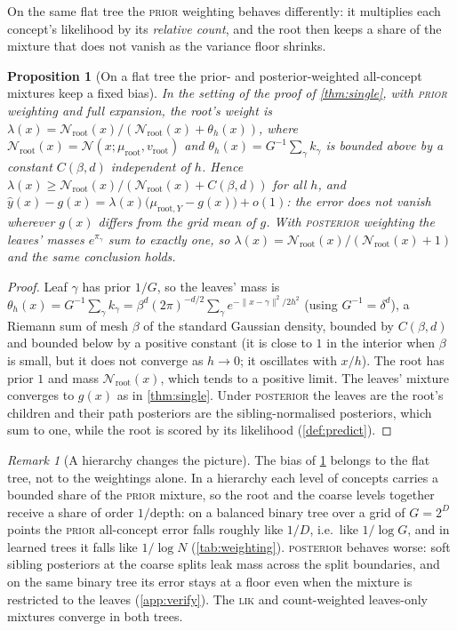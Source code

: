 \documentclass[11pt]{article}
\newtheorem{proposition}[theorem]{Proposition}
\theoremstyle{definition}
\theoremstyle{remark}
\newtheorem{remark}[theorem]{Remark}
\newcommand{\N}{\mathcal{N}}
\newcommand{\hy}{\hat{y}}
\begin{document}
On the same flat tree the \textsc{prior} weighting behaves differently: it multiplies each
concept's likelihood by its \emph{relative count}, and the root then keeps a share of the
mixture that does not vanish as the variance floor shrinks.

\begin{proposition}[On a flat tree the prior- and posterior-weighted all-concept mixtures keep a fixed bias]\label{prop:prior}
In the setting of the proof of \cref{thm:single}, with \textsc{prior} weighting and full
expansion, the root's weight is
$\lambda(x)=\N_{\text{root}}(x)/(\N_{\text{root}}(x)+\theta_h(x))$, where
$\N_{\text{root}}(x)=\N(x;\mu_{\text{root}},v_{\text{root}})$ and
$\theta_h(x)=G^{-1}\sum_\gamma k_\gamma$ is bounded above by a constant $C(\beta,d)$
independent of $h$.  Hence $\lambda(x)\ge\N_{\text{root}}(x)/(\N_{\text{root}}(x)+C(\beta,d))$
for all $h$, and $\hy(x)-g(x)=\lambda(x)\bigl(\mu_{\text{root},Y}-g(x)\bigr)+o(1)$: the
error does not vanish wherever $g(x)$ differs from the grid mean of $g$.  With
\textsc{posterior} weighting the leaves' masses $e^{\pi_\gamma}$ sum to exactly one, so
$\lambda(x)=\N_{\text{root}}(x)/(\N_{\text{root}}(x)+1)$ and the same conclusion holds.
\end{proposition}
\begin{proof}
Leaf $\gamma$ has prior $1/G$, so the leaves' mass is $\theta_h(x)=G^{-1}\sum_\gamma
k_\gamma=\beta^d(2\pi)^{-d/2}\sum_\gamma e^{-\|x-\gamma\|^2/2h^2}$ (using $G^{-1}=\delta^d$),
a Riemann sum of mesh $\beta$ of the standard Gaussian density, bounded by $C(\beta,d)$
and bounded below by a positive constant (it is close to $1$ in the interior when
$\beta$ is small, but it does not converge as $h\to0$; it oscillates with $x/h$).  The root has prior $1$ and mass $\N_{\text{root}}(x)$, which tends to a positive limit.
The leaves' mixture converges to $g(x)$ as in \cref{thm:single}.  Under \textsc{posterior}
the leaves are the root's children and their path posteriors are the sibling-normalised
posteriors, which sum to one, while the root is scored by its likelihood
(\cref{def:predict}).
\end{proof}

\begin{remark}[A hierarchy changes the picture]\label{rem:hierarchy}
The bias of \cref{prop:prior} belongs to the flat tree, not to the weightings alone.  In a
hierarchy each level of concepts carries a bounded share of the \textsc{prior} mixture, so
the root and the coarse levels together receive a share of order $1/\text{depth}$: on a
balanced binary tree over a grid of $G=2^D$ points the \textsc{prior} all-concept error
falls roughly like $1/D$, i.e.\ like $1/\log G$, and in learned trees it falls like
$1/\log N$ (\cref{tab:weighting}).  \textsc{posterior} behaves worse: soft sibling
posteriors at the coarse splits leak mass across the split boundaries, and on the same
binary tree its error stays at a floor even when the mixture is restricted to the leaves
(\cref{app:verify}).  The \textsc{lik} and count-weighted leaves-only mixtures converge
in both trees.
\end{remark}
\end{document}
